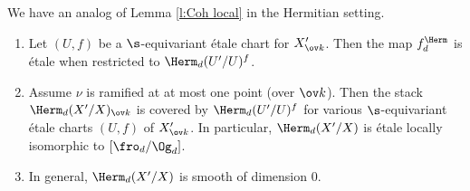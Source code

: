 We have an analog of Lemma \ref{l:Coh local} in the Hermitian setting.

\begin{lemma}
\notready\label{l:Herm local}
\begin{enumerate}
\item Let $(U,f)$ be a $\s$-equivariant \'etale chart for $X'_{\ov k}$. Then the map $f^{\Herm}_{d}$ is \'etale when restricted to $\Herm_{d}(U'/U)^{f}$.
\item Assume $\nu$ is ramified at at most one point (over $\ov k$). Then the stack $\Herm_{d}(X'/X)_{\ov k}$  is covered by $\Herm_{d}(U'/U)^{f}$ for various $\s$-equivariant \'etale charts $(U,f)$ of $X'_{\ov k}$. In particular,  $\Herm_{d}(X'/X)$ is \'etale locally isomorphic to  $[\fro_{d}/\Og_{d}]$.
\item In general, $\Herm_{d}(X'/X)$ is smooth of dimension $0$.
\end{enumerate}
\end{lemma}
